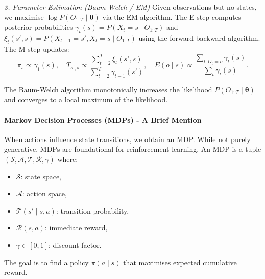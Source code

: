 \documentclass{tufte-handout}
\begin{document}
\emph{3. Parameter Estimation (Baum-Welch / EM)}
Given observations but no states, we maximise $\log P(O_{1:T} \mid \boldsymbol{\theta})$ via the EM algorithm. The E-step computes posterior probabilities $\gamma_t(s) = P(X_t=s \mid O_{1:T})$ and $\xi_t(s',s) = P(X_{t-1}=s', X_t=s \mid O_{1:T})$ using the forward-backward algorithm. The M-step updates:
\[
\pi_s \propto \gamma_1(s),\quad T_{s',s} \propto \frac{\sum_{t=2}^T \xi_t(s',s)}{\sum_{t=2}^T \gamma_{t-1}(s')},\quad
E(o \mid s) \propto \frac{\sum_{t: O_t=o} \gamma_t(s)}{\sum_t \gamma_t(s)}.
\]

\begin{thm}
    The Baum-Welch algorithm monotonically increases the likelihood $P(O_{1:T} \mid \boldsymbol{\theta})$ and converges to a local maximum of the likelihood.
\end{thm}

\paragraph{Markov Decision Processes (MDPs) - A Brief Mention}
When actions influence state transitions, we obtain an MDP. While not purely generative, MDPs are foundational for reinforcement learning. An MDP is a tuple $(\mathcal{S}, \mathcal{A}, \mathcal{T}, \mathcal{R}, \gamma)$ where:
\begin{itemize}
    \item $\mathcal{S}$: state space,
    \item $\mathcal{A}$: action space,
    \item $\mathcal{T}(s' \mid s, a)$: transition probability,
    \item $\mathcal{R}(s,a)$: immediate reward,
    \item $\gamma \in [0,1]$: discount factor.
\end{itemize}
The goal is to find a policy $\pi(a \mid s)$ that maximises expected cumulative reward.
\end{document}
